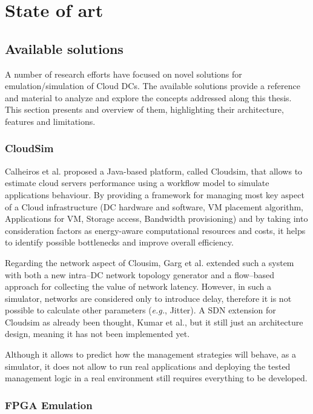 \documentclass[12pt,english,oneside]{book}
\begin{document}
\chapter{State of art \label{cha:stateofart} }

\section{Available solutions}

A number of research efforts have focused on novel solutions for emulation/simulation of Cloud DCs.
The available solutions provide a reference and material to analyze and explore the concepts addressed along this thesis. 
This section presents and overview of them, highlighting their architecture, features and limitations.

\subsection{CloudSim}
\hspace{0.6cm}

Calheiros et al.\cite{cloudsim} proposed a Java-based platform, called Cloudsim, that allows to estimate cloud servers performance using a workflow model to simulate applications behaviour.
By providing a framework for managing most key aspect of a Cloud infrastructure (DC hardware and software, VM placement algorithm, Applications for VM, Storage access, Bandwidth provisioning) and by taking into consideration factors as energy-aware computational resources and costs, it helps to identify possible bottlenecks and improve overall efficiency.

Regarding the network aspect of Clousim, Garg et al.\cite{cloudsim2} extended such a system with both a new intra--DC network topology generator and a flow--based approach for collecting the value of network latency. However, in such a simulator, networks are considered only to introduce delay, therefore it is not possible to calculate other parameters (\textit{e.g.}, Jitter).
A SDN extension for Cloudsim as already been thought, Kumar et al.\cite{cloudsim3}, but it still just an architecture design, meaning it has not been implemented yet.

Although it allows to predict how the management strategies will behave, as a simulator, it does not allow to run real applications and deploying the tested management logic in a real environment still requires everything to be developed.

\subsection{FPGA Emulation}
\hspace{0.6cm}
\end{document}
